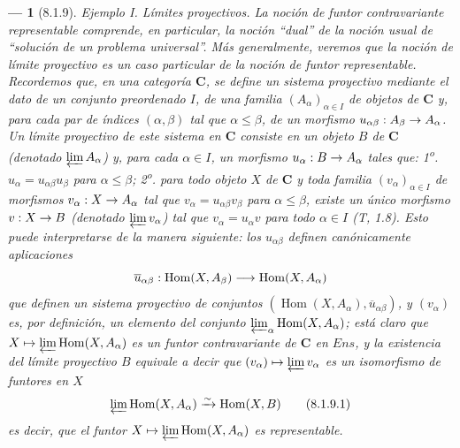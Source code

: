 \documentclass[10pt,oneside,openany]{book}
\makeatletter
\theoremstyle{egaenv}\newtheorem*{env}{---}
\theoremstyle{egastatement}
\theoremstyle{egadescription}
\newcommand{\oldpage}[2][]{\marginnote{\normalfont\scriptsize\textbf{#1}\,|\,#2}\ignorespaces}
\renewcommand{\leq}{\leqslant}
\let\ega@shortmapsto\mapsto
\renewcommand{\to}{\mathchoice{\longrightarrow}{\rightarrow}{\rightarrow}{\rightarrow}}
\renewcommand{\mapsto}{\mathchoice{\longmapsto}{\ega@shortmapsto}{\ega@shortmapsto}{\ega@shortmapsto}}
\makeatother
\begin{document}
\begin{env}[8.1.9]
\label{0.8.1.9}
\label{0.8.1.9-fr}
\textit{Ejemplo I. Límites proyectivos}.
La noción de funtor contravariante representable comprende, en particular, la noción ``dual'' de la noción usual de ``solución de un problema universal''.
\oldpage[0\textsubscript{III}]{8}
Más generalmente, veremos que la noción de \emph{límite proyectivo} es un caso particular de la noción de funtor representable.
Recordemos que, en una categoría $\boldsymbol{C}$, se define un \emph{sistema proyectivo} mediante el dato de un conjunto preordenado $I$, de una familia $(A_\alpha)_{\alpha\in I}$ de objetos de $\boldsymbol{C}$ y, para cada par de índices $(\alpha,\beta)$ tal que $\alpha\leq\beta$, de un morfismo $u_{\alpha\beta}:A_\beta\to A_\alpha$.
Un \emph{límite proyectivo} de este sistema en $\boldsymbol{C}$ consiste en un objeto $B$ de $\boldsymbol{C}$ (denotado $\varprojlim A_\alpha$) y, para cada $\alpha\in I$, un morfismo $u_\alpha:B\to A_\alpha$ tales que: 1\textsuperscript{o}. $u_\alpha=u_{\alpha\beta}u_\beta$ para $\alpha\leq\beta$; 2\textsuperscript{o}. para todo objeto $X$ de $\boldsymbol{C}$ y toda familia $(v_\alpha)_{\alpha\in I}$ de morfismos $v_\alpha:X\to A_\alpha$ tal que $v_\alpha=u_{\alpha\beta}v_\beta$ para $\alpha\leq\beta$, existe un único morfismo $v:X\to B$ (denotado $\varprojlim v_\alpha$) tal que $v_\alpha=u_\alpha v$ para todo $\alpha\in I$ (T, 1.8).
Esto puede interpretarse de la manera siguiente: los $u_{\alpha\beta}$ definen canónicamente aplicaciones
\[
  \overline{u}_{\alpha\beta}:\operatorname{Hom}(X,A_\beta)
  \to\operatorname{Hom}(X,A_\alpha)
\]
que definen un \emph{sistema proyectivo} de conjuntos $(\operatorname{Hom}(X,A_\alpha),\overline{u}_{\alpha\beta})$, y $(v_\alpha)$ es, por definición, un elemento del conjunto $\varprojlim_\alpha\operatorname{Hom}(X,A_\alpha)$; está claro que $X\mapsto\varprojlim\operatorname{Hom}(X,A_\alpha)$ es un \emph{funtor contravariante} de $\boldsymbol{C}$ en $\boldsymbol{\mathit{Ens}}$, y la existencia del límite proyectivo $B$ equivale a decir que $(v_\alpha)\mapsto\varprojlim v_\alpha$ es un \emph{isomorfismo} de funtores en $X$
\[
  \varprojlim\operatorname{Hom}(X,A_\alpha)
  \xrightarrow{\sim}\operatorname{Hom}(X,B)
  \tag{8.1.9.1}
\]
es decir, que el funtor $X\mapsto\varprojlim\operatorname{Hom}(X,A_\alpha)$ es \emph{representable}.
\end{env}
\end{document}
